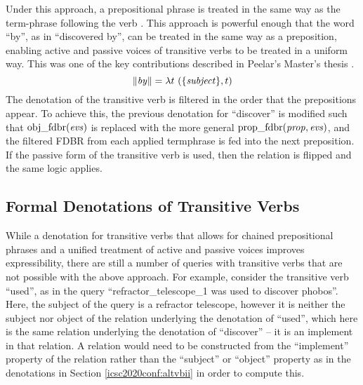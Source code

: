 \documentclass[../main.tex]{subfiles}
\begin{document}
\begin{refsection}
Under this approach, a prepositional phrase is treated in the same way as the term-phrase following the verb \cite{peelar2016accommodating}.
This approach is powerful enough that the word ``by'', as in ``discovered by'', can be treated in the same way as a preposition, enabling active and passive voices of transitive verbs to be treated in a uniform way.  This was one of the key contributions described in Peelar's Master's thesis \cite{peelar2016accommodating}.
\[
\meaningof{\mathit{by}} = \lambda t\ (\{\mathit{subject}\}, t)
\]
The denotation of the transitive verb is filtered in the order that the prepositions appear.  To achieve this, the previous denotation for ``discover'' is modified such that $\mathrm{obj\_fdbr}(\mathit{evs})$ is replaced with the more general $\mathrm{prop\_fdbr}(\mathit{prop, evs})$, and the filtered FDBR from each applied termphrase is fed into the next preposition.  If the passive form of the transitive verb is used, then the relation is flipped and the same logic applies.

\subsection{Formal Denotations of Transitive Verbs}

While a denotation for transitive verbs that allows for chained prepositional phrases and a unified treatment of active and passive voices improves expressibility, there are still a number of queries with transitive verbs that are not possible with the above approach. For example, consider the transitive verb ``used'', as in the query ``refractor\_telescope\_1 was used to discover phobos''.  Here, the subject of the query is a refractor telescope, however it is neither the subject nor object of the relation underlying the denotation of ``used'', which here is the same relation underlying the denotation of ``discover'' -- it is an implement in that relation. 
A relation would need to be constructed from the ``implement'' property of the relation rather than the ``subject'' or ``object'' property as in the denotations in Section \ref{icsc2020conf:altvbii} in order to compute this.

\newcommand{\mbinrel}[3]{\mathrm{make\_binrel}({#1}, {#2}, {#3})}


\end{refsection}
\end{document}
